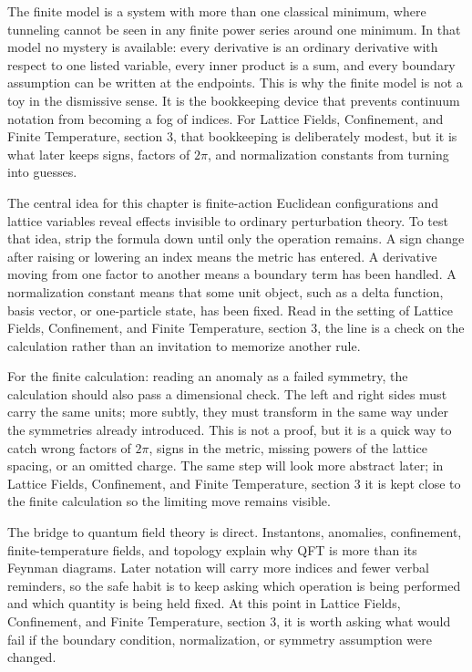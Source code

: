The finite model is a system with more than one classical minimum, where tunneling cannot be seen in any finite power series around one minimum.  In that model no mystery is available: every derivative is an ordinary derivative with respect to one listed variable, every inner product is a sum, and every boundary assumption can be written at the endpoints.  This is why the finite model is not a toy in the dismissive sense.  It is the bookkeeping device that prevents continuum notation from becoming a fog of indices.  For Lattice Fields, Confinement, and Finite Temperature, section 3, that bookkeeping is deliberately modest, but it is what later keeps signs, factors of \(2\pi\), and normalization constants from turning into guesses.

The central idea for this chapter is finite-action Euclidean configurations and lattice variables reveal effects invisible to ordinary perturbation theory.  To test that idea, strip the formula down until only the operation remains.  A sign change after raising or lowering an index means the metric has entered.  A derivative moving from one factor to another means a boundary term has been handled.  A normalization constant means that some unit object, such as a delta function, basis vector, or one-particle state, has been fixed.  Read in the setting of Lattice Fields, Confinement, and Finite Temperature, section 3, the line is a check on the calculation rather than an invitation to memorize another rule.

For the finite calculation: reading an anomaly as a failed symmetry, the calculation should also pass a dimensional check.  The left and right sides must carry the same units; more subtly, they must transform in the same way under the symmetries already introduced.  This is not a proof, but it is a quick way to catch wrong factors of \(2\pi\), signs in the metric, missing powers of the lattice spacing, or an omitted charge.  The same step will look more abstract later; in Lattice Fields, Confinement, and Finite Temperature, section 3 it is kept close to the finite calculation so the limiting move remains visible.

The bridge to quantum field theory is direct.  Instantons, anomalies, confinement, finite-temperature fields, and topology explain why QFT is more than its Feynman diagrams.  Later notation will carry more indices and fewer verbal reminders, so the safe habit is to keep asking which operation is being performed and which quantity is being held fixed.  At this point in Lattice Fields, Confinement, and Finite Temperature, section 3, it is worth asking what would fail if the boundary condition, normalization, or symmetry assumption were changed.

